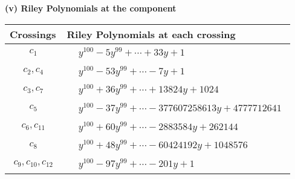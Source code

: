 \documentclass[1p]{elsarticle_modified}
\theoremstyle{definition}
\begin{document}
\flushleft \textbf{(v) Riley Polynomials at the component}\newline \\
\begin{tabular}{m{50pt}|m{274pt}}
Crossings & \hspace{64pt}Riley Polynomials at each crossing \\
\hline $$\begin{aligned}c_{1}\end{aligned}$$&$\begin{aligned}
&y^{100}-5 y^{99}+\cdots+33 y+1
\end{aligned}$\\
\hline $$\begin{aligned}c_{2},c_{4}\end{aligned}$$&$\begin{aligned}
&y^{100}-53 y^{99}+\cdots-7 y+1
\end{aligned}$\\
\hline $$\begin{aligned}c_{3},c_{7}\end{aligned}$$&$\begin{aligned}
&y^{100}+36 y^{99}+\cdots+13824 y+1024
\end{aligned}$\\
\hline $$\begin{aligned}c_{5}\end{aligned}$$&$\begin{aligned}
&y^{100}-37 y^{99}+\cdots-377607258613 y+4777712641
\end{aligned}$\\
\hline $$\begin{aligned}c_{6},c_{11}\end{aligned}$$&$\begin{aligned}
&y^{100}+60 y^{99}+\cdots-2883584 y+262144
\end{aligned}$\\
\hline $$\begin{aligned}c_{8}\end{aligned}$$&$\begin{aligned}
&y^{100}+48 y^{99}+\cdots-60424192 y+1048576
\end{aligned}$\\
\hline $$\begin{aligned}c_{9},c_{10},c_{12}\end{aligned}$$&$\begin{aligned}
&y^{100}-97 y^{99}+\cdots-201 y+1
\end{aligned}$\\
\hline
\end{tabular}\\~\\
\end{document}
